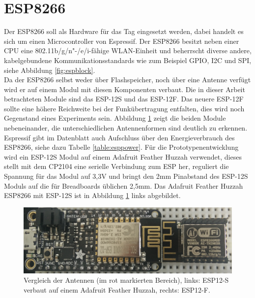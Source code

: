 \section{ESP8266}
Der ESP8266 soll als Hardware für das Tag eingesetzt werden, dabei handelt es sich um einen Microcontroller von Espressif.
Der ESP8266 besitzt neben einer CPU eine 802.11b/g/n"-/e/i-fähige WLAN-Einheit und beherrscht diverse andere, kabelgebundene Kommunikationsstandards wie zum Beispiel GPIO, I2C und SPI, siehe Abbildung \ref{fig:espblock}. \\
Da der ESP8266 selbst weder über Flashspeicher, noch über eine Antenne verfügt wird er auf einem Modul mit diesen Komponenten verbaut. 
Die in dieser Arbeit betrachteten Module sind das ESP-12S und das ESP-12F.
Das neuere ESP-12F sollte eine höhere Reichweite bei der Funkübertragung entfalten, dies wird noch Gegenstand eines Experiments sein.
Abbildung \ref{fig:espmodules} zeigt die beiden Module nebeneinander, die unterschiedlichen Antennenformen sind deutlich zu erkennen.\\
Espressif gibt im Datenblatt auch Aufschluss über den Energieverbrauch des ESP8266, siehe dazu Tabelle \ref{table:esppower}.
Für die Prototypenentwicklung wird ein ESP-12S Modul auf einem Adafruit Feather Huzzah verwendet, dieses stellt mit dem CP2104 eine serielle Verbindung zum ESP her, reguliert die Spannung für das Modul auf 3,3V und bringt den 2mm Pinabstand des ESP-12S Moduls auf die für Breadboards üblichen 2,5mm.
Das Adafruit Feather Huzzah ESP8266 mit ESP-12S ist in Abbildung \ref{fig:espmodules} links abgebildet.

\begin{figure}[h]
  \centering
	\includegraphics[width=\textwidth]{images/espmodules.png}
  \caption{Vergleich der Antennen (im rot markierten Bereich), links: ESP12-S verbaut auf einem Adafruit Feather Huzzah, rechts: ESP12-F.}
  \label{fig:espmodules}
\end{figure}

